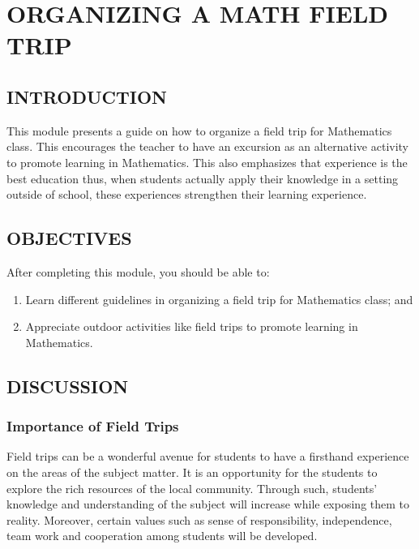 \chapter{ORGANIZING A MATH FIELD TRIP}
\section*{INTRODUCTION}
This module presents a guide on how to organize a field trip for Mathematics class. This
encourages the teacher to have an excursion as an alternative activity to promote learning in
Mathematics. This also emphasizes that experience is the best education thus, when students actually
apply their knowledge in a setting outside of school, these experiences strengthen their learning
experience.
\section*{OBJECTIVES}
After completing this module, you should be able to:
\begin{enumerate}
\item Learn different guidelines in organizing a field trip for Mathematics class; and
\item Appreciate outdoor activities like field trips to promote learning in Mathematics.
\end{enumerate}
\section*{DISCUSSION}
\subsection*{Importance of Field Trips}
Field trips can be a wonderful avenue for students to have a firsthand experience on the areas
of the subject matter. It is an opportunity for the students to explore the rich resources of the local
community. Through such, students’ knowledge and understanding of the subject will increase while
exposing them to reality. Moreover, certain values such as sense of responsibility, independence, team
work and cooperation among students will be developed.
